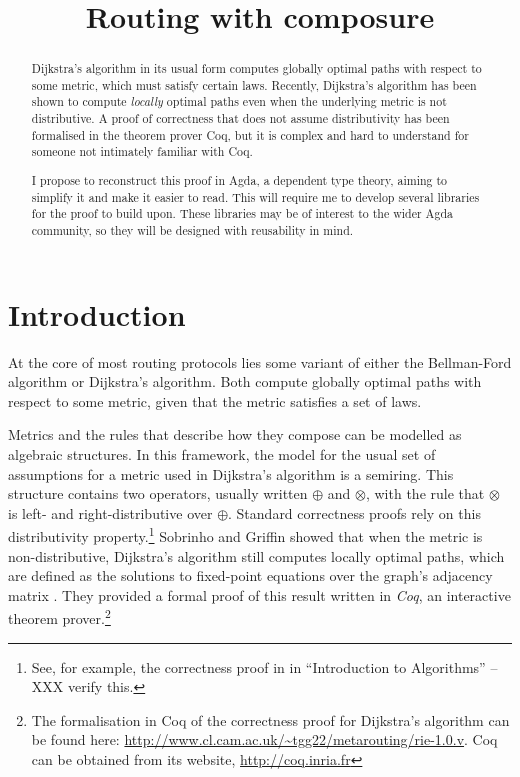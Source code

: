 \documentclass[a4paper]{scrartcl}
\title{\phantomsection%
  Routing with composure%
  \label{generalised-big-operators-in-agda}}
\author{}
\date{}
\begin{document}
\maketitle


\begin{abstract}
Dijkstra's algorithm in its usual form computes globally optimal paths with respect to some metric, which must satisfy certain laws. Recently, Dijkstra's algorithm has been shown to compute \emph{locally} optimal paths even when the underlying metric is not distributive. A proof of correctness that does not assume distributivity has been formalised in the theorem prover Coq, but it is complex and hard to understand for someone not intimately familiar with Coq.

I propose to reconstruct this proof in Agda, a dependent type theory, aiming to simplify it and make it easier to read. This will require me to develop several libraries for the proof to build upon. These libraries may be of interest to the wider Agda community, so they will be designed with reusability in mind.
\end{abstract}


\section{Introduction%
  \label{introduction}%
}

At the core of most routing protocols lies some variant of either the Bellman-Ford algorithm or Dijkstra's algorithm. Both compute globally optimal paths with respect to some metric, given that the metric satisfies a set of laws.

Metrics and the rules that describe how they compose can be modelled as algebraic structures. In this framework, the model for the usual set of assumptions for a metric used in Dijkstra's algorithm is a semiring. This structure contains two operators, usually written \(\oplus\) and \(\otimes\), with the rule that \(\otimes\) is left- and right-distributive over \(\oplus\). Standard correctness proofs rely on this distributivity property.\footnote{See, for example, the correctness proof in in \enquote{Introduction to Algorithms} \autocite[XXX]{cormen_introduction_2009} -- XXX verify this.} Sobrinho and Griffin showed that when the metric is non-distributive, Dijkstra's algorithm still computes locally optimal paths, which are defined as the solutions to fixed-point equations over the graph's adjacency matrix \autocite{sobrinho_routing_2010}. They provided a formal proof of this result written in \emph{Coq}, an interactive theorem prover.\footnote{The formalisation in Coq of the correctness proof for Dijkstra's algorithm can be found here: \url{http://www.cl.cam.ac.uk/~tgg22/metarouting/rie-1.0.v}. Coq can be obtained from its website, \url{http://coq.inria.fr}}
\end{document}
